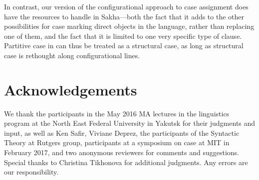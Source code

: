 \documentclass[output=paper]{langsci/langscibook}
\begin{document}
In contrast, our version of the configurational approach to case assignment
does have the resources to handle  in Sakha—both the fact
that it adds to the other possibilities for case marking direct objects in the
language, rather than replacing one of them, and the fact that it is limited to
one very specific type of clause. Partitive case in  can thus be
treated as a structural case, as long as structural case is rethought along
configurational lines.

\printchapterglossary{}

\section*{Acknowledgements}

We thank the participants in the May 2016 MA lectures in the linguistics
program at the North East Federal University in Yakutsk for their judgments and
input, as well as Ken Safir, Viviane Deprez, the participants of the Syntactic
Theory at Rutgers group, participants at a symposium on case at MIT in February
2017, and two anonymous reviewers for comments and suggestions. Special thanks
to Christina Tikhonova for additional  judgments. Any errors are our
responsibility.

{\sloppy
\printbibliography[heading=subbibliography,notkeyword=this]
}
\end{document}
